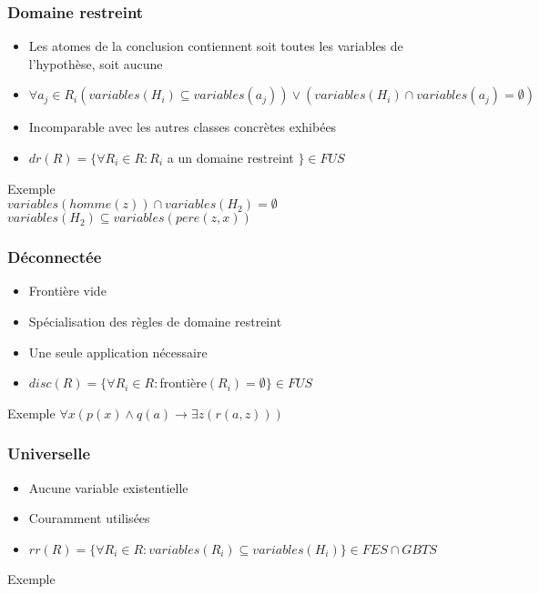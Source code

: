 \begin{frame}
	\frametitle{Domaine restreint}
	\begin{itemize}
		\item Les atomes de la conclusion contiennent soit toutes les variables de
		l'hypothèse, soit aucune
		\item $\forall a_j \in R_i (variables(H_i) \subseteq variables(a_j)) \vee 
		(variables(H_i) \cap variables(a_j) = \emptyset)$
		\item Incomparable avec les autres classes concrètes exhibées
		\item $dr(R) = \{\forall R_i \in R : R_i$ a un domaine restreint $\} \in FUS$
	\end{itemize}
	\begin{exampleblock}{Exemple}
		 \\
		$variables(homme(z)) \cap variables(H_2) = \emptyset$\\
		$variables(H_2) \subseteq variables(pere(z,x))$
	\end{exampleblock}
\end{frame}

\begin{frame}
	\frametitle{Déconnectée}
	\begin{itemize}
		\item Frontière vide
		\item Spécialisation des règles de domaine restreint
		\item Une seule application nécessaire
		\item $disc(R) = \{\forall R_i \in R : $frontière$(R_i) = \emptyset \} \in FUS$
	\end{itemize}
	\begin{exampleblock}{Exemple}
		$\forall x (p(x) \wedge q(a) \rightarrow \exists z (r(a,z)))$
	\end{exampleblock}
\end{frame}

\begin{frame}
	\frametitle{Universelle}
	\begin{itemize}
		\item Aucune variable existentielle
		\item Couramment utilisées
		\item $rr(R) = \{\forall R_i \in R : variables(R_i) \subseteq variables(H_i) \}
		\in FES \cap GBTS$
	\end{itemize}
	\begin{exampleblock}{Exemple}
	\end{exampleblock}
\end{frame}

